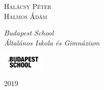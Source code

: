 \begin{titlepage}
	{\scshape\Large Halácsy Péter \\ Halmos Ádám \\} %
	
	\vspace{0.5\baselineskip} %
	
	\textit{Budapest School \\ Általános Iskola és Gimnázium} %
	
	\vfill %
	
	
	\includegraphics[width=2cm]{logo}
	
	\vspace{0.3\baselineskip} %
	
	2019 %
	
	

\end{titlepage}